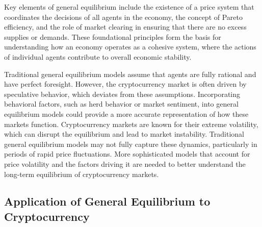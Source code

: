 Key elements of general equilibrium include the existence of a price system that coordinates the decisions of all agents in the economy, the concept of Pareto efficiency, and the role of market clearing in ensuring that there are no excess supplies or demands. These foundational principles form the basis for understanding how an economy operates as a cohesive system, where the actions of individual agents contribute to overall economic stability.

Traditional general equilibrium models assume that agents are fully rational and have perfect foresight. However, the cryptocurrency market is often driven by speculative behavior, which deviates from these assumptions. Incorporating behavioral factors, such as herd behavior or market sentiment, into general equilibrium models could provide a more accurate representation of how these markets function.
Cryptocurrency markets are known for their extreme volatility, which can disrupt the equilibrium and lead to market instability. Traditional general equilibrium models may not fully capture these dynamics, particularly in periods of rapid price fluctuations. More sophisticated models that account for price volatility and the factors driving it are needed to better understand the long-term equilibrium of cryptocurrency markets.

\subsection{Application of General Equilibrium to Cryptocurrency}

